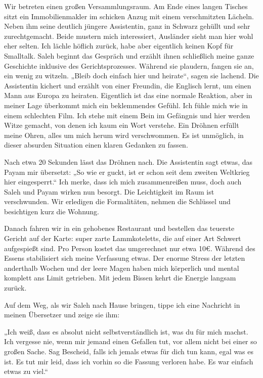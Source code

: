 Wir betreten einen großen Versammlungsraum. Am Ende eines langen Tisches sitzt ein Immobilienmakler im schicken Anzug mit einem verschmitzten Lächeln. Neben ihm seine deutlich jüngere Assistentin, ganz in Schwarz gehüllt und sehr zurechtgemacht. Beide mustern mich interessiert, Ausländer sieht man hier wohl eher selten. Ich lächle höflich zurück, habe aber eigentlich keinen Kopf für Smalltalk. Saleh beginnt das Gespräch und erzählt ihnen schließlich meine ganze Geschichte inklusive des Gerichtsprozesses. Während sie plaudern, fangen sie an, ein wenig zu witzeln. „Bleib doch einfach hier und heirate“, sagen sie lachend. Die Assistentin kichert und erzählt von einer Freundin, die Englisch lernt, um einen Mann aus Europa zu heiraten. Eigentlich ist das eine normale Reaktion, aber in meiner Lage überkommt mich ein beklemmendes Gefühl. Ich fühle mich wie in einem schlechten Film. Ich stehe mit einem Bein im Gefängnis und hier werden Witze gemacht, von denen ich kaum ein Wort verstehe. Ein Dröhnen erfüllt meine Ohren, alles um mich herum wird verschwommen. Es ist unmöglich, in dieser absurden Situation einen klaren Gedanken zu fassen.

Nach etwa 20 Sekunden lässt das Dröhnen nach. Die Assistentin sagt etwas, das Payam mir übersetzt: „So wie er guckt, ist er schon seit dem zweiten Weltkrieg hier eingesperrt.“ Ich merke, dass ich mich zusammenreißen muss, doch auch Saleh und Payam wirken nun besorgt. Die Leichtigkeit im Raum ist verschwunden. Wir erledigen die Formalitäten, nehmen die Schlüssel und besichtigen kurz die Wohnung.

Danach fahren wir in ein gehobenes Restaurant und bestellen das teuerste Gericht auf der Karte: super zarte Lammkoteletts, die auf einer Art Schwert aufgespießt sind. Pro Person kostet das umgerechnet nur etwa 10€. Während des Essens stabilisiert sich meine Verfassung etwas. Der enorme Stress der letzten anderthalb Wochen und der leere Magen haben mich körperlich und mental komplett ans Limit getrieben. Mit jedem Bissen kehrt die Energie langsam zurück.

Auf dem Weg, als wir Saleh nach Hause bringen, tippe ich eine Nachricht in meinen Übersetzer und zeige sie ihm:

„Ich weiß, dass es absolut nicht selbstverständlich ist, was du für mich machst. Ich vergesse nie, wenn mir jemand einen Gefallen tut, vor allem nicht bei einer so großen Sache. Sag Bescheid, falls ich jemals etwas für dich tun kann, egal was es ist. Es tut mir leid, dass ich vorhin so die Fassung verloren habe. Es war einfach etwas zu viel.“

